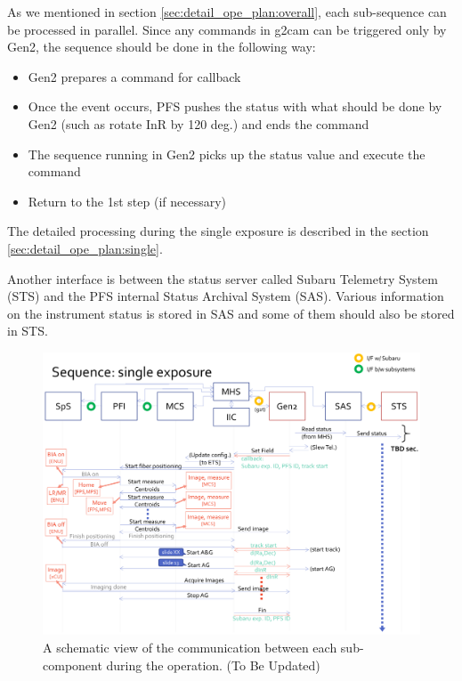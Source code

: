 \documentclass[a4paper]{article}
\begin{document}
As we mentioned in section \ref{sec:detail_ope_plan:overall}, each
sub-sequence can be processed in parallel. Since any commands in g2cam
can be triggered only by Gen2, the sequence should be done in the
following way:
\begin{itemize}
\item Gen2 prepares a command for callback
\item Once the event occurs, PFS pushes the status with what should be done by Gen2 (such as rotate InR by 120 deg.) and ends the command
\item The sequence running in Gen2 picks up the status value and execute the command
\item Return to the 1st step (if necessary)
\end{itemize}
The detailed processing during the single exposure is described in the section \ref{sec:detail_ope_plan:single}.

Another interface is between the status server called Subaru Telemetry
System (STS) and the PFS internal Status Archival System
(SAS). Various information on the instrument status is stored in SAS
and some of them should also be stored in STS.

\begin{figure}[!htb]
\begin{center}
\includegraphics[scale=0.2]{./figures/PFS_sequence_process.pdf}
\end{center}
\caption{A schematic view of the communication between each sub-component during the operation. (To Be Updated)\label{fig:single_exposure_sequence2}}
\end{figure}
\end{document}
